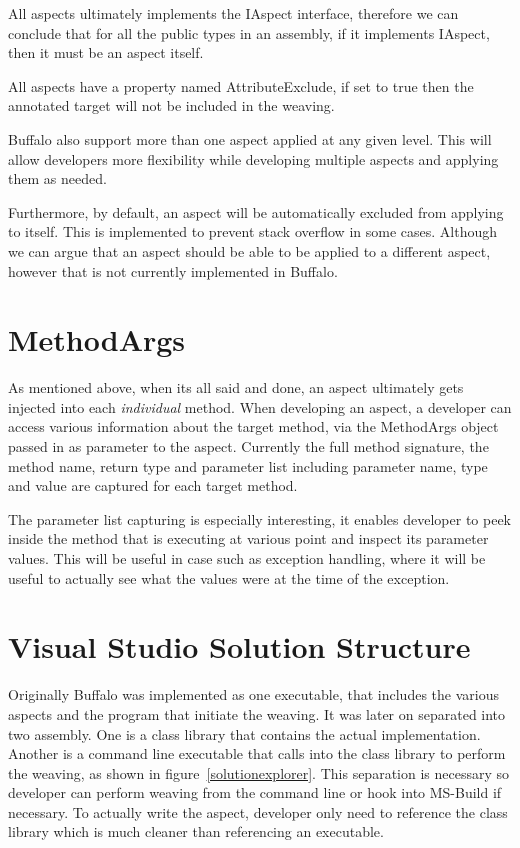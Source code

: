 All aspects ultimately implements the IAspect interface, therefore we can conclude that for all the public types in an assembly, if it implements IAspect, then it must be an aspect itself.

All aspects have a property named AttributeExclude, if set to true then the annotated target will not be included in the weaving.

Buffalo also support more than one aspect applied at any given level. This will allow developers more flexibility while developing multiple aspects and applying them as needed.

Furthermore, by default, an aspect will be automatically excluded from applying to itself. This is implemented to prevent stack overflow in some cases. Although we can argue that an aspect should be able to be applied to a different aspect, however that is not currently implemented in Buffalo.

\section{MethodArgs}

As mentioned above, when its all said and done, an aspect ultimately gets injected into each \textit{individual} method. When developing an aspect, a developer can access various information about the target method, via the MethodArgs object passed in as parameter to the aspect. Currently the full method signature, the method name, return type and parameter list including parameter name, type and value are captured for each target method.

The parameter list capturing is especially interesting, it enables developer to peek inside the method that is executing at various point and inspect its parameter values. This will be useful in case such as exception handling, where it will be useful to actually see what the values were at the time of the exception.

\section{Visual Studio Solution Structure}

Originally Buffalo was implemented as one executable, that includes the various aspects and the program that initiate the weaving. It was later on separated into two assembly. One is a class library that contains the actual implementation. Another is a command line executable that calls into the class library to perform the weaving, as shown in figure~\ref{solutionexplorer}. This separation is necessary so developer can perform weaving from the command line or hook into MS-Build if necessary. To actually write the aspect, developer only need to reference the class library which is much cleaner than referencing an executable.

